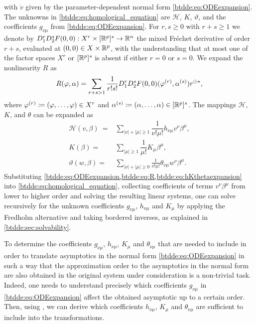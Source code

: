 with $\dot{v}$ given by the parameter-dependent normal form
\cref{btdde:eq:ODEexpansion}. The unknowns in \cref{btdde:eq:homological_equation} are
$\mathcal{H}$, $K$, $\vartheta$, and the coefficients $g_{\nu\mu}$ from
\cref{btdde:eq:ODEexpansion}. For $r, s \ge 0$ with $r + s \ge 1$ we denote by
$D_1^rD_2^sF(0,0) : X^r \times [\mathbb{R}^p]^s \rightarrow \mathbb{R}^n$ the mixed Fr\'echet
derivative of order $r + s$, evaluated at $(0,0) \in X \times \mathbb{R}^p$, with the
understanding that at most one of the factor spaces $X^r$ or $[\mathbb{R}^p]^s$ is
absent if either $r = 0$ or $s = 0$. We expand the nonlinearity $R$ as
\begin{equation}
  \label{btdde:eq:R}
  R(\varphi,\alpha) = \sum_{r + s > 1}\frac{1}{r!s!}D_1^rD_2^sF(0,0)(\varphi^{(r)},\alpha^{(s)})r^{\odot\star},
\end{equation}
where $\varphi^{(r)} \coloneqq (\varphi,\dots,\varphi)\in X^r$ and $\alpha^{(s)} \coloneqq
(\alpha,\dots,\alpha)\in [\mathbb{R}^p]^s$. The mappings $\mathcal{H}$, $K$, and
$\theta$ can be expanded as
\begin{equation}
\label{btdde:eq:hKthetaexpansion}
\begin{aligned}
    \mathcal{H}(v,\beta)\ ={}& \sum_{|\nu| + |\mu| \geq 1}\dfrac{1}{\nu!\mu!}h_{\nu\mu}v^{\nu}\beta^{\mu}, \\
    K(\beta) ={}& \sum_{|\mu| \geq 1}\dfrac{1}{\mu!}K_{\mu}\beta^{\mu}, \\
    \vartheta(w, \beta) ={}& \sum_{|\nu|+|\mu| \geq 0} \frac1{\nu!\mu!} \theta_{\nu\mu} w^\nu \beta^\mu.
\end{aligned}
\end{equation}
Substituting \cref{btdde:eq:ODEexpansion,btdde:eq:R,btdde:eq:hKthetaexpansion} into
\cref{btdde:eq:homological_equation}, collecting coefficients of terms
$v^{\nu}\beta^{\mu}$ from lower to higher order and solving the resulting
linear systems, one can solve recursively for the unknown coefficients
$g_{\nu\mu}$, $h_{\nu\mu}$ and $K_{\mu}$ by applying the Fredholm alternative
and taking bordered inverses, as explained in \cref{btdde:sec:solvability}.

\begin{remark}
To determine the coefficients $g_{\nu\mu}$, $h_{\nu\mu}$, $K_{\mu}$ and
$\theta_{\nu\mu}$ that are needed to include in order to translate asymptotics
in the normal form \cref{btdde:eq:ODEexpansion} in such a way that the approximation
order to the asymptotics in the normal form are also obtained in the original
system under consideration is a non-trivial task. Indeed, one needs to
understand precisely which coefficients $g_{\nu\mu}$ in \cref{btdde:eq:ODEexpansion}
affect the obtained asymptotic up to a certain order. Then, using
\cite[Proposition 1]{Bosschaert@Interplay}, we can derive which coefficients
$h_{\nu\mu}$, $K_{\mu}$ and $\theta_{\nu\mu}$ are sufficient to include into
the transformations.
\end{remark}

